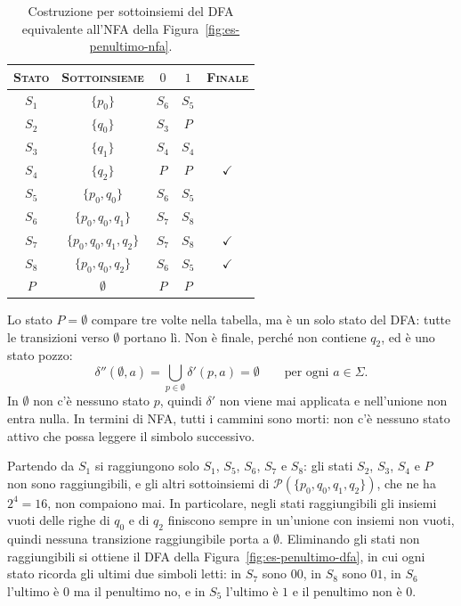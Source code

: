 \documentclass[a4paper, 11pt, oneside]{book}
\theoremstyle{formale}
\begin{document}
    \begin{table}[H]
        \centering
        \begin{tabular}{ccccc}
            \toprule
            \textsc{Stato} & \textsc{Sottoinsieme} & $0$ & $1$ & \textsc{Finale} \\
            \midrule
            $S_1$ & $\{p_0\}$ & $S_6$ & $S_5$ & \\
            $S_2$ & $\{q_0\}$ & $S_3$ & $P$ & \\
            $S_3$ & $\{q_1\}$ & $S_4$ & $S_4$ & \\
            $S_4$ & $\{q_2\}$ & $P$ & $P$ & $\checkmark$ \\
            $S_5$ & $\{p_0, q_0\}$ & $S_6$ & $S_5$ & \\
            $S_6$ & $\{p_0, q_0, q_1\}$ & $S_7$ & $S_8$ & \\
            $S_7$ & $\{p_0, q_0, q_1, q_2\}$ & $S_7$ & $S_8$ & $\checkmark$ \\
            $S_8$ & $\{p_0, q_0, q_2\}$ & $S_6$ & $S_5$ & $\checkmark$ \\
            $P$ & $\emptyset$ & $P$ & $P$ & \\
            \bottomrule
        \end{tabular}
        \caption{Costruzione per sottoinsiemi del DFA equivalente all'NFA della
            Figura~\ref{fig:es-penultimo-nfa}.}
        \label{tab:es-penultimo-dfa}
    \end{table}

    Lo stato $P = \emptyset$ compare tre volte nella tabella, ma \`e un solo stato del
    DFA: tutte le transizioni verso $\emptyset$ portano l\`i. Non \`e finale, perch\'e
    non contiene $q_2$, ed \`e uno stato pozzo:
    \begin{equation*}
        \delta''(\emptyset, a) = \bigcup_{p \in \emptyset} \delta'(p, a) = \emptyset
        \qquad \text{per ogni } a \in \Sigma.
    \end{equation*}
    In $\emptyset$ non c'\`e nessuno stato $p$, quindi $\delta'$ non viene mai applicata
    e nell'unione non entra nulla. In termini di NFA, tutti i cammini sono morti: non
    c'\`e nessuno stato attivo che possa leggere il simbolo successivo.

    Partendo da $S_1$ si raggiungono solo $S_1$, $S_5$, $S_6$, $S_7$ e $S_8$: gli stati
    $S_2$, $S_3$, $S_4$ e $P$ non sono raggiungibili, e gli altri sottoinsiemi di
    $\mathcal{P}(\{p_0, q_0, q_1, q_2\})$, che ne ha $2^4 = 16$, non compaiono mai. In
    particolare, negli stati raggiungibili gli insiemi vuoti delle righe di $q_0$ e di
    $q_2$ finiscono sempre in un'unione con insiemi non vuoti, quindi nessuna transizione
    raggiungibile porta a $\emptyset$. Eliminando gli stati non raggiungibili si ottiene il
    DFA della Figura~\ref{fig:es-penultimo-dfa}, in cui ogni stato ricorda gli ultimi due
    simboli letti: in $S_7$ sono $00$, in $S_8$ sono $01$, in $S_6$ l'ultimo \`e $0$ ma
    il penultimo no, e in $S_5$ l'ultimo \`e $1$ e il penultimo non \`e $0$.
\end{document}
